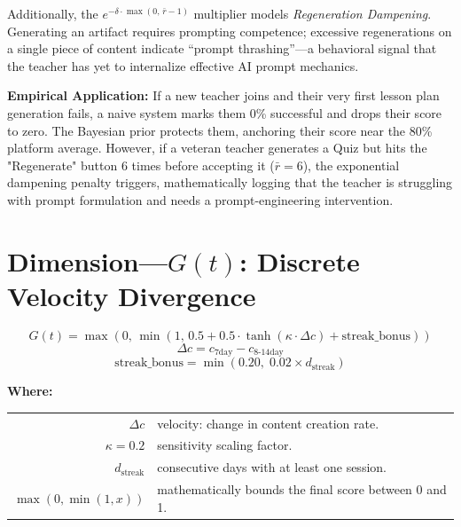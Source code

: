 \documentclass[11pt,a4paper]{article}
\begin{document}
Additionally, the $e^{-\delta \cdot \max(0,\, \bar{r} - 1)}$ multiplier models \textit{Regeneration Dampening}. Generating an artifact requires prompting competence; excessive regenerations on a single piece of content indicate ``prompt thrashing''---a behavioral signal that the teacher has yet to internalize effective AI prompt mechanics.

\textbf{Empirical Application:}
If a new teacher joins and their very first lesson plan generation fails, a naive system marks them 0\% successful and drops their score to zero. The Bayesian prior protects them, anchoring their score near the 80\% platform average. However, if a veteran teacher generates a Quiz but hits the "Regenerate" button 6 times before accepting it ($\bar{r}=6$), the exponential dampening penalty triggers, mathematically logging that the teacher is struggling with prompt formulation and needs a prompt-engineering intervention.

\section{Dimension---$G(t)$: Discrete Velocity Divergence}

\begin{equation}
    G(t) = \max\left(0,\, \min\left(1,\, 0.5 + 0.5 \cdot \tanh\!\left(\kappa \cdot \Delta c\right) + \text{streak\_bonus}\right)\right)
\end{equation}
\begin{equation}
    \Delta c = c_{7\text{day}} - c_{8\text{-}14\text{day}}
\end{equation}
\begin{equation}
    \text{streak\_bonus} = \min(0.20,\; 0.02 \times d_{\text{streak}})
\end{equation}

\noindent \textbf{Where:}

\vspace{0.25em}
\noindent
\begin{tabular}{@{} r p{11cm} @{}}
    $\Delta c$ & velocity: change in content creation rate. \\
    $\kappa = 0.2$ & sensitivity scaling factor. \\
    $d_{\text{streak}}$ & consecutive days with at least one session. \\
    $\max(0, \min(1, x))$ & mathematically bounds the final score between 0 and 1. \\
\end{tabular}
\end{document}
